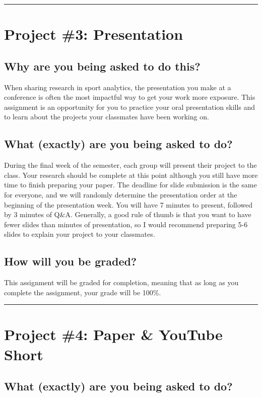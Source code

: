 \documentclass{article}
\begin{document}
  \hrule
  \section*{\sc Project \#3: Presentation}

    \subsection*{\sc Why are you being asked to do this?}

      When sharing research in sport analytics, the presentation you make at a conference is often the most impactful way to get your work more exposure. This assignment is an opportunity for you to practice your oral presentation skills and to learn about the projects your classmates have been working on.
    
    \subsection*{\sc What (exactly) are you being asked to do?}

      During the final week of the semester, each group will present their project to the class. Your research should be complete at this point although you still have more time to finish preparing your paper. The deadline for slide submission is the same for everyone, and we will randomly determine the presentation order at the beginning of the presentation week. You will have 7 minutes to present, followed by 3 minutes of Q\&A. Generally, a good rule of thumb is that you want to have fewer slides than minutes of presentation, so I would recommend preparing 5-6 slides to explain your project to your classmates.

    \subsection*{\sc How will you be graded?}

      This assignment will be graded for completion, meaning that as long as you complete the assignment, your grade will be 100\%.\\

  \hrule
  \section*{\sc Project \#4: Paper \& YouTube Short}

    \subsection*{\sc What (exactly) are you being asked to do?}
\end{document}
